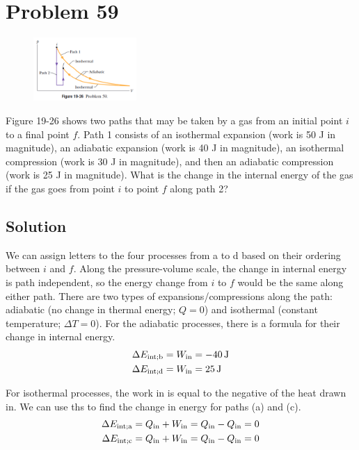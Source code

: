 \documentclass[12pt]{article}
\begin{document}
    \pagebreak
    \section{Problem 59}
        \begin{figure}
            \vspace{-30pt}
            \includegraphics[width=0.35\textwidth]{picture_19-26.png} 
        \end{figure}
        Figure 19-26 shows two paths that may be taken by a gas from an initial point $i$ to a final point $f$. 
        Path 1 consists of an isothermal expansion (work is 50 J in magnitude), an adiabatic expansion (work is 40 J in magnitude), an isothermal compression (work is 30 J in magnitude), and then an adiabatic compression (work is 25 J in magnitude). 
        What is the change in the internal energy of the gas if the gas goes from point $i$ to point $f$ along path 2?

        \subsection{Solution}
            We can assign letters to the four processes from a to d based on their ordering between $i$ and $f$.
            Along the pressure-volume scale, the change in internal energy is path independent, so the energy change from $i$ to $f$ would be the same along either path.
            There are two types of expansions/compressions along the path: adiabatic (no change in thermal energy; $Q = 0$) and isothermal (constant temperature; $\Delta T = 0$).
            For the adiabatic processes, there is a formula for their change in internal energy.
            \begin{align}
                \Delta E_{\rm int; b}  &=  W_{\rm in}
                    =   -40\,\unit{\joule}\\
                \Delta E_{\rm int; d}  &=  W_{\rm in}
                    =   25\,\unit{\joule}
            \end{align}

            For isothermal processes, the work in is equal to the negative of the heat drawn in.
            We can use ths to find the change in energy for paths (a) and (c).
            \begin{align}
                \Delta E_{\rm int; a}  &=  Q_{\rm in} + W_{\rm in}
                    =   Q_{\rm in} - Q_{\rm in}
                    =   0\\
                \Delta E_{\rm int; c}  &=  Q_{\rm in} + W_{\rm in}
                    =   Q_{\rm in} - Q_{\rm in}
                    =   0
            \end{align}
\end{document}
